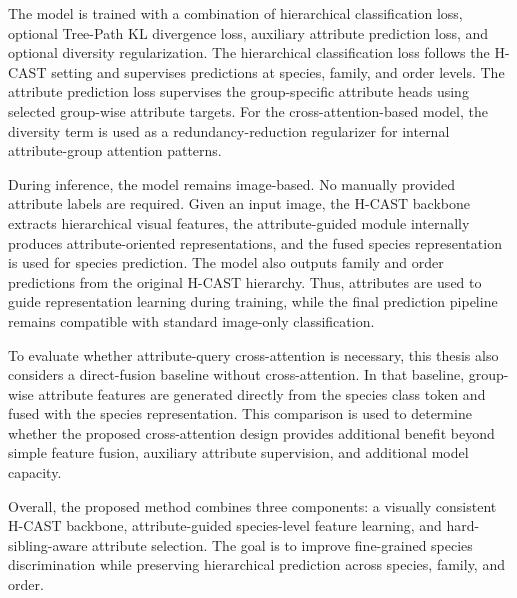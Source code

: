 The model is trained with a combination of hierarchical classification loss, optional Tree-Path KL divergence loss, auxiliary attribute prediction loss, and optional diversity regularization. The hierarchical classification loss follows the H-CAST setting and supervises predictions at species, family, and order levels. The attribute prediction loss supervises the group-specific attribute heads using selected group-wise attribute targets. For the cross-attention-based model, the diversity term is used as a redundancy-reduction regularizer for internal attribute-group attention patterns.

During inference, the model remains image-based. No manually provided attribute labels are required. Given an input image, the H-CAST backbone extracts hierarchical visual features, the attribute-guided module internally produces attribute-oriented representations, and the fused species representation is used for species prediction. The model also outputs family and order predictions from the original H-CAST hierarchy. Thus, attributes are used to guide representation learning during training, while the final prediction pipeline remains compatible with standard image-only classification.

To evaluate whether attribute-query cross-attention is necessary, this thesis also considers a direct-fusion baseline without cross-attention. In that baseline, group-wise attribute features are generated directly from the species class token and fused with the species representation. This comparison is used to determine whether the proposed cross-attention design provides additional benefit beyond simple feature fusion, auxiliary attribute supervision, and additional model capacity.

Overall, the proposed method combines three components: a visually consistent H-CAST backbone, attribute-guided species-level feature learning, and hard-sibling-aware attribute selection. The goal is to improve fine-grained species discrimination while preserving hierarchical prediction across species, family, and order.